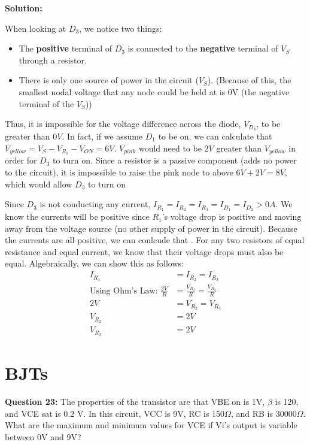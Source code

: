 \documentclass{article}
\begin{document}
\textbf{Solution:} 

When looking at $D_3$, we notice two things:
\begin{itemize}
    \item The \textbf{positive} terminal of $D_3$ is connected to the \textbf{negative} terminal of $V_S$ through a resistor.
    \item There is only one source of power in the circuit ($V_S$). (Because of this, the smallest nodal voltage that any node could be held at is 0V (the negative terminal of the $V_S$))
\end{itemize}

Thus, it is impossible for the voltage difference across the diode, $V_{D_3}$, to be greater than $0V$. In fact, if we assume $D_1$ to be on, we can calculate that $V_{yellow} = V_S - V_{R_1} - V_{ON} = 6V$. $V_{pink}$ would need to be $2V$ greater than $V_{yellow}$ in order for $D_3$ to turn on. Since a resistor is a passive component (adds no power to the circuit), it is impossible to raise the pink node to above $6V+2V = 8V$, which would allow $D_3$ to turn on 

Since $D_3$ is not conducting any current, $I_{R_1} = I_{R_2} = I_{R_3} = I_{D_1} = I_{D_2} > 0A $. 
We know the currents will be positive since $R_1$'s voltage drop is positive and moving away from the voltage source 
(no other supply of power in the circuit). 
Because the currents are all positive, we can conlcude that . 
For any two resistors of equal resistance and equal current, 
we know that their voltage drops must also be equal.
 Algebraically, we can show this as follows:
\begin{align*}
    I_{R_1} &= I_{R_2} = I_{R_3} \\
    \text{Using Ohm's Law: }\frac{2V}{R} &= \frac{V_{R_2}}{R} = \frac{V_{R_3}}{R} \\
    2V &= V_{R_2} = V_{R_3} \\ 
    V_{R_2} &= \boxed {2V } \\
    V_{R_3} &= \boxed {2V }
\end{align*} 



\pagebreak

\section*{BJTs}
\textbf{Question 23:} The properties of the transistor are that VBE on is 1V, \(\beta\) is 120, and VCE sat is 0.2 V. In this circuit, VCC is 9V, RC is 150\(\Omega\), and RB is 30000\(\Omega\). What are the maximum and minimum values for VCE if Vi’s output is variable between 0V and 9V?
\end{document}
